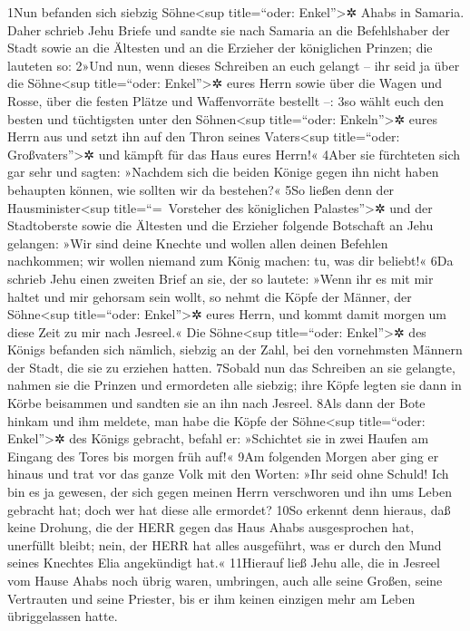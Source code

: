 1Nun befanden sich siebzig Söhne\textless sup title=``oder:
Enkel''\textgreater✲ Ahabs in Samaria. Daher schrieb Jehu Briefe und
sandte sie nach Samaria an die Befehlshaber der Stadt sowie an die
Ältesten und an die Erzieher der königlichen Prinzen; die lauteten so:
2»Und nun, wenn dieses Schreiben an euch gelangt -- ihr seid ja über die
Söhne\textless sup title=``oder: Enkel''\textgreater✲ eures Herrn sowie
über die Wagen und Rosse, über die festen Plätze und Waffenvorräte
bestellt --: 3so wählt euch den besten und tüchtigsten unter den
Söhnen\textless sup title=``oder: Enkeln''\textgreater✲ eures Herrn aus
und setzt ihn auf den Thron seines Vaters\textless sup title=``oder:
Großvaters''\textgreater✲ und kämpft für das Haus eures Herrn!« 4Aber
sie fürchteten sich gar sehr und sagten: »Nachdem sich die beiden Könige
gegen ihn nicht haben behaupten können, wie sollten wir da bestehen?«
5So ließen denn der Hausminister\textless sup title=``=~Vorsteher des
königlichen Palastes''\textgreater✲ und der Stadtoberste sowie die
Ältesten und die Erzieher folgende Botschaft an Jehu gelangen: »Wir sind
deine Knechte und wollen allen deinen Befehlen nachkommen; wir wollen
niemand zum König machen: tu, was dir beliebt!« 6Da schrieb Jehu einen
zweiten Brief an sie, der so lautete: »Wenn ihr es mit mir haltet und
mir gehorsam sein wollt, so nehmt die Köpfe der Männer, der
Söhne\textless sup title=``oder: Enkel''\textgreater✲ eures Herrn, und
kommt damit morgen um diese Zeit zu mir nach Jesreel.« Die
Söhne\textless sup title=``oder: Enkel''\textgreater✲ des Königs
befanden sich nämlich, siebzig an der Zahl, bei den vornehmsten Männern
der Stadt, die sie zu erziehen hatten. 7Sobald nun das Schreiben an sie
gelangte, nahmen sie die Prinzen und ermordeten alle siebzig; ihre Köpfe
legten sie dann in Körbe beisammen und sandten sie an ihn nach Jesreel.
8Als dann der Bote hinkam und ihm meldete, man habe die Köpfe der
Söhne\textless sup title=``oder: Enkel''\textgreater✲ des Königs
gebracht, befahl er: »Schichtet sie in zwei Haufen am Eingang des Tores
bis morgen früh auf!« 9Am folgenden Morgen aber ging er hinaus und trat
vor das ganze Volk mit den Worten: »Ihr seid ohne Schuld! Ich bin es ja
gewesen, der sich gegen meinen Herrn verschworen und ihn ums Leben
gebracht hat; doch wer hat diese alle ermordet? 10So erkennt denn
hieraus, daß keine Drohung, die der HERR gegen das Haus Ahabs
ausgesprochen hat, unerfüllt bleibt; nein, der HERR hat alles
ausgeführt, was er durch den Mund seines Knechtes Elia angekündigt hat.«
11Hierauf ließ Jehu alle, die in Jesreel vom Hause Ahabs noch übrig
waren, umbringen, auch alle seine Großen, seine Vertrauten und seine
Priester, bis er ihm keinen einzigen mehr am Leben übriggelassen hatte.

